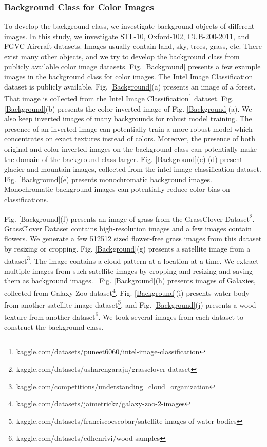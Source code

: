 \documentclass{article}
\begin{document}
\subsubsection{Background Class for Color Images}
To develop the background class, we investigate background objects of different images. In this study, we investigate STL-10, Oxford-102, CUB-200-2011, and FGVC Aircraft datasets. Images usually contain land, sky, trees, grass, etc. There exist many other objects, and we try to develop the background class from publicly available color image datasets. Fig. \ref{Background} presents a few example images in the background class for color images. The Intel Image Classification dataset is publicly available.  Fig. \ref{Background}(a) presents an image of a forest. That image is collected from the Intel Image Classification\footnote{kaggle.com/datasets/puneet6060/intel-image-classification} dataset. Fig. \ref{Background}(b) presents the color-inverted image of Fig. \ref{Background}(a). We also keep inverted images of many backgrounds for robust model training. The presence of an inverted image can potentially train a more robust model which concentrates on exact textures instead of colors. Moreover, the presence of both original and color-inverted images on the background class can potentially make the domain of the background class larger. Fig. \ref{Background}(c)-(d) present glacier and mountain images, collected from the intel image classification dataset.
Fig. \ref{Background}(e) presents monochromatic background images. Monochromatic background images can potentially reduce color bias on classifications. 

Fig. \ref{Background}(f) presents an image of grass from the GrassClover Dataset\footnote{kaggle.com/datasets/usharengaraju/grassclover-dataset}. GrassClover Dataset contains high-resolution images and a few images contain flowers. We generate a few 512512 sized flower-free grass images from this dataset by resizing or cropping.
Fig. \ref{Background}(g) presents a satellite image from a dataset\footnote{kaggle.com/competitions/understanding\_cloud\_organization}. The image contains a cloud pattern at a location at a time. We extract multiple images from such satellite images by cropping and resizing and saving them as background images.  Fig. \ref{Background}(h) presents images of Galaxies, collected from Galaxy Zoo dataset\footnote{kaggle.com/datasets/jaimetrickz/galaxy-zoo-2-images}.
Fig. \ref{Background}(i) presents water body from another satellite image dataset\footnote{kaggle.com/datasets/franciscoescobar/satellite-images-of-water-bodies}, and Fig. \ref{Background}(j) presents a wood texture from another dataset\footnote{kaggle.com/datasets/edhenrivi/wood-samples}. We took several images from each dataset to construct the background class. 
\end{document}
